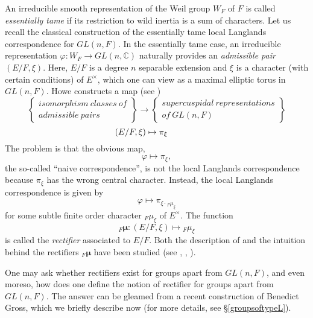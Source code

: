 \documentclass[11pt]{amsart}
\theoremstyle{plain}
\theoremstyle{definition}
\begin{document}
An irreducible smooth representation of the Weil group $W_F$ of $F$ is
called \emph{essentially tame} if its restriction to wild inertia is a
sum of characters.  Let us recall the classical construction of the
essentially tame local Langlands correspondence for $GL(n,F)$.  In the
essentially tame case, an irreducible representation $\varphi : W_F
\rightarrow GL(n,\mathbb{C})$ naturally provides an \emph{admissible
  pair} $(E/F, \xi)$.  Here, $E/F$ is a degree $n$ separable extension
and $\xi$ is a character (with certain conditions) of $E^{\times}$,
which one can view as a maximal elliptic torus in $GL(n,F)$.  Howe
constructs a map (see \cite{howe})
\begin{equation*}
\left\{
\begin{array}{ll}
isomorphism \ classes \ of \\
admissible \ pairs
\end{array}
\right\} \rightarrow \left\{
\begin{array}{ll}
supercuspidal \ representations \\
of \ GL(n,F)
\end{array} \right\}
\end{equation*}
$$\hspace{-.5in} (E/F, \xi) \mapsto \pi_{\xi}$$
The problem is that the obvious map, $$\varphi \mapsto \pi_{\xi},$$
the so-called ``naive correspondence'', is not the local Langlands
correspondence because $\pi_{\xi}$ has the wrong central character.
Instead, the local Langlands correspondence is given by $$\varphi
\mapsto \pi_{\xi \cdot {}_F \mu_{\xi}}$$ for some subtle finite order
character ${}_F \mu_{\xi}$ of $E^{\times}$.  The function $${}_F
\boldsymbol\mu : (E/F, \xi) \mapsto {}_F \mu_{\xi}$$ is called the
\emph{rectifier} associated to $E/F$.  Both the description of and the
intuition behind the rectifiers ${}_F \boldsymbol\mu$ have been
studied (see \cite{bushnellhenniart}, \cite{geo}, \cite{adrian}).

One may ask whether rectifiers exist for groups apart from $GL(n,F)$,
and even moreso, how does one define the notion of rectifier for
groups apart from $GL(n,F)$.  The answer can be gleamed from a recent
construction of Benedict Gross, which we briefly describe now (for
more details, see \S\ref{groupsoftypeL}).
\end{document}
